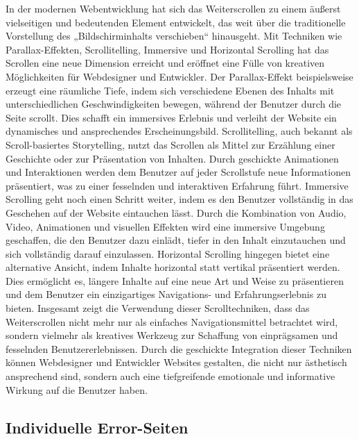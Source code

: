 In der modernen Webentwicklung hat sich das Weiterscrollen zu einem äußerst vielseitigen und bedeutenden Element entwickelt, 
das weit über die traditionelle Vorstellung des „Bildschirminhalts verschieben“ hinausgeht. Mit Techniken wie Parallax-Effekten, 
Scrollitelling, Immersive und Horizontal Scrolling hat das Scrollen eine neue Dimension erreicht und eröffnet eine Fülle von kreativen 
Möglichkeiten für Webdesigner und Entwickler.
Der Parallax-Effekt beispielsweise erzeugt eine räumliche Tiefe, indem sich verschiedene Ebenen des Inhalts mit unterschiedlichen 
Geschwindigkeiten bewegen, während der Benutzer durch die Seite scrollt. Dies schafft ein immersives Erlebnis und verleiht der Website 
ein dynamisches und ansprechendes Erscheinungsbild.
Scrollitelling, auch bekannt als Scroll-basiertes Storytelling, nutzt das Scrollen als Mittel zur Erzählung einer Geschichte oder zur 
Präsentation von Inhalten. Durch geschickte Animationen und Interaktionen werden dem Benutzer auf jeder Scrollstufe neue Informationen 
präsentiert, was zu einer fesselnden und interaktiven Erfahrung führt.
Immersive Scrolling geht noch einen Schritt weiter, indem es den Benutzer vollständig in das Geschehen auf der Website eintauchen lässt. 
Durch die Kombination von Audio, Video, Animationen und visuellen Effekten wird eine immersive Umgebung geschaffen, die den Benutzer dazu 
einlädt, tiefer in den Inhalt einzutauchen und sich vollständig darauf einzulassen.
Horizontal Scrolling hingegen bietet eine alternative Ansicht, indem Inhalte horizontal statt vertikal präsentiert werden. Dies ermöglicht 
es, längere Inhalte auf eine neue Art und Weise zu präsentieren und dem Benutzer ein einzigartiges Navigations- und Erfahrungserlebnis zu bieten.
Insgesamt zeigt die Verwendung dieser Scrolltechniken, dass das Weiterscrollen nicht mehr nur als einfaches Navigationsmittel betrachtet 
wird, sondern vielmehr als kreatives Werkzeug zur Schaffung von einprägsamen und fesselnden Benutzererlebnissen. Durch die geschickte 
Integration dieser Techniken können Webdesigner und Entwickler Websites gestalten, die nicht nur ästhetisch ansprechend sind, sondern 
auch eine tiefgreifende emotionale und informative Wirkung auf die Benutzer haben.

\subsection{Individuelle Error-Seiten}

